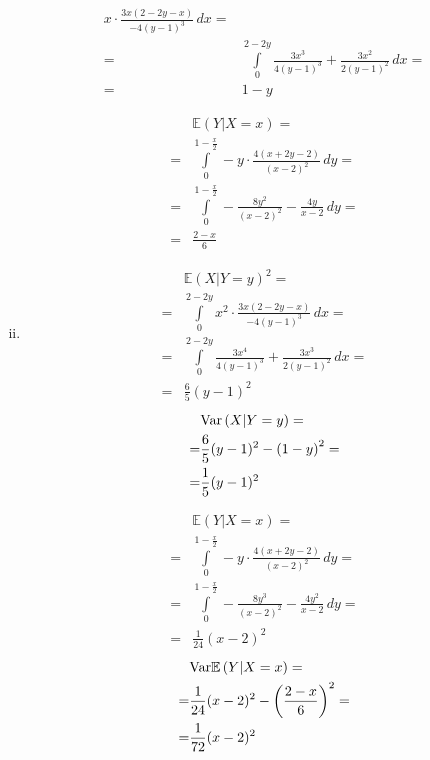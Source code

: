 \begin{enumerate}[(i)]
\begin{minipage}[t]{0.5\textwidth}
\begin{align*}
x\cdot\frac{3x(2-2y-x)}{-4 (y-1)^3}
\,dx
=\\=&
\int\limits_{0}^{2-2y}
\frac{3 x^3}{4 (y-1)^3}+\frac{3 x^2}{2 (y-1)^2}
\,dx
=\\=&
1-y
\end{align*}
\end{minipage}
\begin{minipage}[t]{0.5\textwidth}
\begin{align*}
&\mathbb E \left(Y|X=x\right)
=\\=&
\int\limits_{0}^{1-\frac{x}{2}}
-y\cdot \frac{4 (x+2 y-2)}{(x-2)^2}
\,dy
=\\=&
\int\limits_{0}^{1-\frac{x}{2}}
-\frac{8 y^2}{(x-2)^2}-\frac{4 y}{x-2}
\,dy
=\\=&
\frac{2-x}{6}
\end{align*}
\end{minipage}
\item 
\begin{minipage}[t]{0.5\textwidth}
\begin{align*}
&\mathbb E \left(X|Y=y\right)^2
=\\=&
\int\limits_{0}^{2-2y}
x^2\cdot\frac{3x(2-2y-x)}{-4 (y-1)^3}
\,dx
=\\=&
\int\limits_{0}^{2-2y}
\frac{3 x^4}{4 (y-1)^3}+\frac{3 x^3}{2 (y-1)^2}
\,dx
=\\=&
\frac{6}{5} (y-1)^2
\end{align*}
\begin{align*}
&\text{Var}\left(X|Y=y\right)
=\\=&
\frac{6}{5} (y-1)^2-\left(1-y\right)^2
=\\=&
\frac{1}{5} (y-1)^2
\end{align*}
\end{minipage}
\begin{minipage}[t]{0.5\textwidth}
\begin{align*}
&\mathbb E \left(Y|X=x\right)
=\\=&
\int\limits_{0}^{1-\frac{x}{2}}
-y\cdot \frac{4 (x+2 y-2)}{(x-2)^2}
\,dy
=\\=&
\int\limits_{0}^{1-\frac{x}{2}}
-\frac{8 y^3}{(x-2)^2}-\frac{4 y^2}{x-2}
\,dy
=\\=&
\frac{1}{24} (x-2)^2
\end{align*}
\begin{align*}
&\text{Var}\mathbb E \left(Y|X=x\right)
=\\=&
\frac{1}{24} (x-2)^2-\left(\frac{2-x}{6}\right)^2
=\\=&
\frac{1}{72} (x-2)^2
\end{align*}
\end{minipage}
\end{enumerate}


